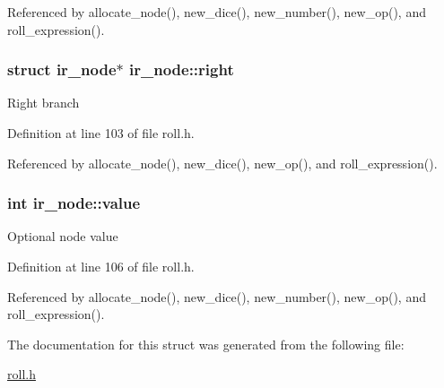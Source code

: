 Referenced by allocate\+\_\+node(), new\+\_\+dice(), new\+\_\+number(), new\+\_\+op(), and roll\+\_\+expression().

\hypertarget{structir__node_ab72283b06a90004232c315bc52b0e9b5}{}
\subsubsection[{right}]{\setlength{\rightskip}{0pt plus 5cm}struct {\bf ir\+\_\+node}$\ast$ ir\+\_\+node\+::right}\label{structir__node_ab72283b06a90004232c315bc52b0e9b5}
Right branch 

Definition at line 103 of file roll.\+h.



Referenced by allocate\+\_\+node(), new\+\_\+dice(), new\+\_\+op(), and roll\+\_\+expression().

\hypertarget{structir__node_a4cd43e9ea9717dc8bda34aa8ca5f8d35}{}
\subsubsection[{value}]{\setlength{\rightskip}{0pt plus 5cm}int ir\+\_\+node\+::value}\label{structir__node_a4cd43e9ea9717dc8bda34aa8ca5f8d35}
Optional node value 

Definition at line 106 of file roll.\+h.



Referenced by allocate\+\_\+node(), new\+\_\+dice(), new\+\_\+number(), new\+\_\+op(), and roll\+\_\+expression().



The documentation for this struct was generated from the following file\+:\begin{DoxyCompactItemize}
\item 
\hyperlink{roll_8h}{roll.\+h}\end{DoxyCompactItemize}
